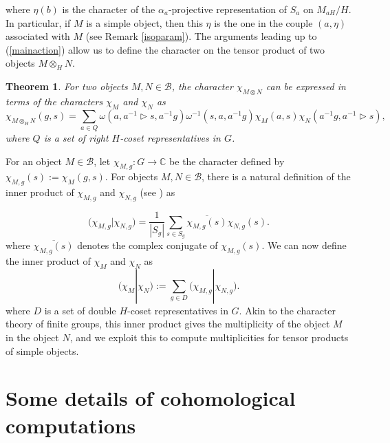 \documentclass[a4paper, 10pt]{book}
\newtheorem{Thm}{Theorem}[chapter]
\theoremstyle{definition}
\numberwithin{equation}{chapter}
\newcommand\hit{\triangleright}
\newcommand\inv{^{-1}}
\newcommand\ot{\otimes}
\newcommand\kk{\mathbb C}
\newcommand\B{\mathcal B}
\newcommand{\ra}\rightarrow
\begin{document}
 where $\eta(b)$ is the character of the $\alpha_a$-projective representation of $S_a$ on $M_{aH}/H$. In particular, if $M$ is a simple object, then this $\eta$ is the one in the couple $(a, \eta)$ associated with $M$ (see Remark \ref{isoparam}). The arguments leading up to (\ref{mainaction}) allow us to define the character on the tensor product of two objects $M\otimes_H N$.
\begin{Thm}\label{thm:tensorchar}
For two objects $M, N \in \B$, the character $\chi_{M\ot N}$ can be expressed in terms of the characters $\chi_M$ and $\chi_N$ as  
\begin{equation}\label{tensorchar}
	\chi_{M\otimes_H N }(g,s) = \sum_{a\in Q} \omega(a, a\inv \hit s, a\inv g)\omega\inv(s,a, a\inv g) \chi_{M}(a,s)\chi_{N}(a\inv g, a\inv \hit s ),
\end{equation} where $Q$ is a set of right $H$-coset representatives in $G$.
\end{Thm}
  
For an object $M \in \B$, let $\chi_{M, g}:G\ra \kk$ be the character defined by $\chi_{M, g}(s) := \chi_M(g, s)$. For objects $M, N\in \B$, there is a natural definition of the inner product of $\chi_{M, g}$ and $ \chi_{N, g}$ (see \cite{MR3299063}) as

\begin{equation*}
\big(\chi_{M, g}| \chi_{N, g}\big) = \frac{1}{|S_g|} \sum_{s\in S_g} \overline{\chi_{M, g}(s)}\chi_{N, g}(s).
\end{equation*}
where $\overline{\chi_{M,g}(s)}$ denotes the complex conjugate of $\chi_{M,g}(s)$.
We can now define the inner product of $\chi_M$ and $\chi_N$ as
\begin{equation}
	(\chi_M| \chi_N) := \sum_{g\in D} \big(\chi_{M, g}| \chi_{N, g}\big).\label{innerprod}
\end{equation}
where $D$ is a set of double $H$-coset representatives in $G$. Akin to the character theory of finite groups, this inner product gives the multiplicity of the object $M$ in the object $N$, and we exploit this to compute multiplicities for tensor products of simple objects.
\section{Some details of cohomological computations}
\end{document}
